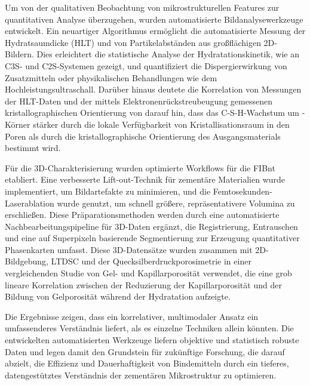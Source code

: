 Um von der qualitativen Beobachtung von mikrostrukturellen Features zur quantitativen Analyse überzugehen, wurden automatisierte Bildanalysewerkzeuge entwickelt.
Ein neuartiger Algorithmus ermöglicht die automatisierte Messung der Hydratsaumdicke (\acs*{HLT}) und von Partikelabständen aus großflächigen 2D-Bildern.
Dies erleichtert die statistische Analyse der Hydratationskinetik, wie an \acs*{C3S}- und \acs*{C2S}-Systemen gezeigt, und quantifiziert die Dispergierwirkung von Zusatzmitteln oder physikalischen Behandlungen wie dem Hochleistungsultraschall.
Darüber hinaus deutete die Korrelation von Messungen der \acs*{HLT}-Daten und der mittels Elektronenrückstreubeugung gemessenen kristallographischen Orientierung von  darauf hin, dass das C-S-H-Wachstum um -Körner stärker durch die lokale Verfügbarkeit von Kristallisationsraum in den Poren als durch die kristallographische Orientierung des Ausgangsmaterials  bestimmt wird.

Für die 3D-Charakterisierung wurden optimierte Workflows für die \acs*{FIBnt} etabliert.
Eine verbesserte Lift-out-Technik für zementäre Materialien wurde implementiert, um Bildartefakte zu minimieren, und die Femtosekunden-Laserablation  wurde genutzt, um schnell größere, repräsentativere Volumina zu erschließen.
Diese Präparationsmethoden werden durch eine automatisierte Nachbearbeitungspipeline für 3D-Daten ergänzt, die Registrierung, Entrauschen und eine auf Superpixeln basierende Segmentierung zur Erzeugung quantitativer Phasenkarten umfasst.
Diese 3D-Datensätze wurden zusammen mit 2D-Bildgebung, \acs*{LTDSC} und der Quecksilberdruckporosimetrie in einer vergleichenden Studie von Gel- und Kapillarporosität verwendet, die eine grob lineare Korrelation zwischen der Reduzierung der Kapillarporosität und der Bildung von Gelporosität während der Hydratation aufzeigte.

Die Ergebnisse zeigen, dass ein korrelativer, multimodaler Ansatz ein umfassenderes Verständnis liefert, als es einzelne Techniken allein könnten.
Die entwickelten automatisierten Werkzeuge liefern objektive und statistisch robuste Daten und legen damit den Grundstein für zukünftige Forschung, die darauf abzielt, die Effizienz und Dauerhaftigkeit von Bindemitteln durch ein tieferes, datengestütztes Verständnis der zementären Mikrostruktur zu optimieren.
